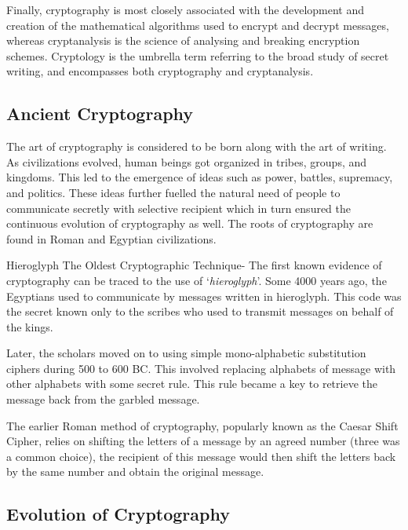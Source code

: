 \documentclass[british]{report}
\begin{document}
Finally, cryptography is most closely associated with the development
and creation of the mathematical algorithms used to encrypt and decrypt
messages, whereas cryptanalysis is the science of analysing and breaking
encryption schemes. Cryptology is the umbrella term referring to the
broad study of secret writing, and encompasses both cryptography and
cryptanalysis.

\subsection{Ancient Cryptography}

The art of cryptography is considered to be born along with the art
of writing. As civilizations evolved, human beings got organized in
tribes, groups, and kingdoms. This led to the emergence of ideas such
as power, battles, supremacy, and politics. These ideas further fuelled
the natural need of people to communicate secretly with selective
recipient which in turn ensured the continuous evolution of cryptography
as well. The roots of cryptography are found in Roman and Egyptian
civilizations.

Hieroglyph \textminus{} The Oldest Cryptographic Technique- The first
known evidence of cryptography can be traced to the use of `\textit{hieroglyph}'.
Some 4000 years ago, the Egyptians used to communicate by messages
written in hieroglyph. This code was the secret known only to the
scribes who used to transmit messages on behalf of the kings.

Later, the scholars moved on to using simple mono-alphabetic substitution
ciphers during 500 to 600 BC. This involved replacing alphabets of
message with other alphabets with some secret rule. This rule became
a key to retrieve the message back from the garbled message.

The earlier Roman method of cryptography, popularly known as the Caesar
Shift Cipher, relies on shifting the letters of a message by an agreed
number (three was a common choice), the recipient of this message
would then shift the letters back by the same number and obtain the
original message.

\subsection{Evolution of Cryptography}
\end{document}
